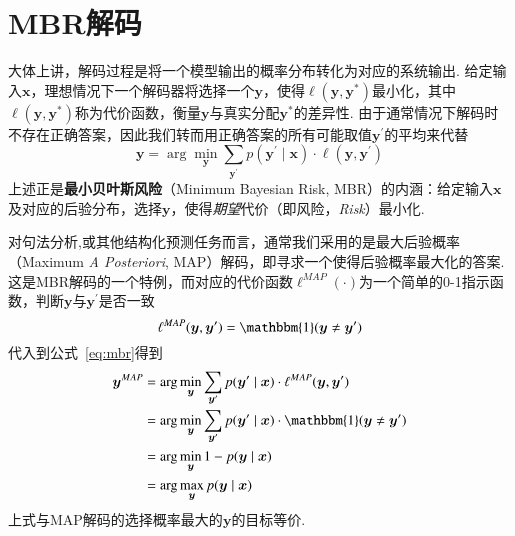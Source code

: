 \section{MBR解码}\label{sec:mbr-decoding}
大体上讲，解码过程是将一个模型输出的概率分布转化为对应的系统输出.
给定输入$\boldsymbol{x}$，理想情况下一个解码器将选择一个$\boldsymbol{y}$，使得$\ell(\boldsymbol{y},\boldsymbol{y}^{\ast})$最小化，其中$\ell(\boldsymbol{y},\boldsymbol{y}^{\ast})$称为代价函数，衡量$\boldsymbol{y}$与真实分配$\boldsymbol{y}^{\ast}$的差异性.
由于通常情况下解码时不存在正确答案，因此我们转而用正确答案的所有可能取值$\boldsymbol{y}^{\prime}$的平均来代替
\begin{equation}
    \label{eq:mbr}
    \boldsymbol{y}= \arg\min_{\boldsymbol{y}}\sum_{\boldsymbol{y}^{\prime}}p(\boldsymbol{y}^{\prime}\mid\boldsymbol{x})\cdot\ell(\boldsymbol{y},\boldsymbol{y}^{\prime})
\end{equation}
上述正是\textbf{最小贝叶斯风险}（Minimum Bayesian Risk, MBR）的内涵：给定输入$\boldsymbol{x}$及对应的后验分布，选择$\boldsymbol{y}$，使得\textit{期望}代价（即风险，\textit{Risk}）最小化\cite{stoyanov-eisner-2012-minimum}.

对句法分析,或其他结构化预测任务而言，通常我们采用的是最大后验概率（Maximum \textit{A Posteriori}, MAP）解码，即寻求一个使得后验概率最大化的答案.
这是MBR解码的一个特例，而对应的代价函数$\ell^{MAP}(\cdot)$为一个简单的0-1指示函数，判断$\boldsymbol{y}$与$\boldsymbol{y}^{\prime}$是否一致
\begin{equation}
    \ell^{MAP}(\boldsymbol{y},\boldsymbol{y}^{\prime}) = \mathbbm{1}(\boldsymbol{y}\neq\boldsymbol{y}^{\prime})
\end{equation}
代入到公式~\ref{eq:mbr}得到
\begin{equation}
    \label{eq:map}
    \begin{split}
        \boldsymbol{y}^{MAP}&= \arg\min_{\boldsymbol{y}}\sum_{\boldsymbol{y}^{\prime}}p(\boldsymbol{y}^{\prime}\mid\boldsymbol{x})\cdot\ell^{MAP}(\boldsymbol{y},\boldsymbol{y}^{\prime})\\
        &=\arg\min_{\boldsymbol{y}}\sum_{\boldsymbol{y}^{\prime}}p(\boldsymbol{y}^{\prime}\mid\boldsymbol{x})\cdot\mathbbm{1}(\boldsymbol{y}\neq\boldsymbol{y}^{\prime})\\
        &=\arg\min_{\boldsymbol{y}} 1-p(\boldsymbol{y}\mid\boldsymbol{x})\\
        &=\arg\max_{\boldsymbol{y}}p(\boldsymbol{y}\mid\boldsymbol{x})
    \end{split}
\end{equation}
上式与MAP解码的选择概率最大的$\boldsymbol{y}$的目标等价.

